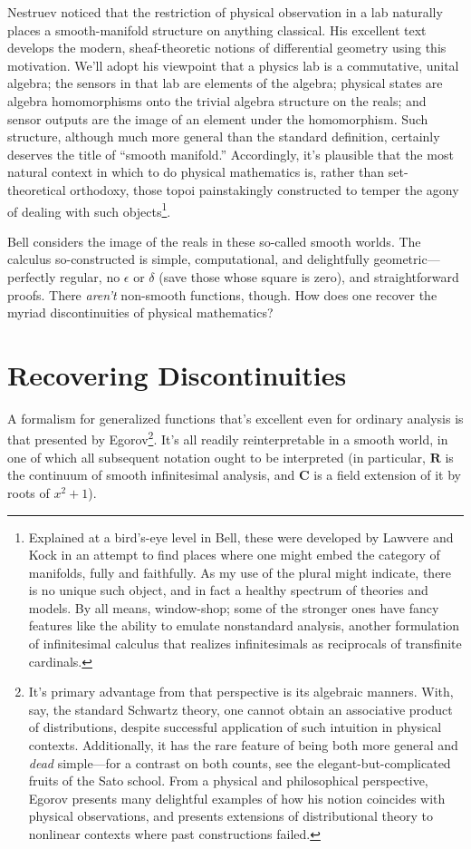 \documentclass{article}
\begin{document}
Nestruev noticed that the restriction of physical observation in a lab naturally places a smooth-manifold structure on anything classical.
His excellent text develops the modern, sheaf-theoretic notions of differential geometry using this motivation.
We'll adopt his viewpoint that a physics lab is a commutative, unital algebra; the sensors in that lab are elements of the algebra;
physical states are algebra homomorphisms onto the trivial algebra structure on the reals;
and sensor outputs are the image of an element under the homomorphism.
Such structure, although much more general than the standard definition, certainly deserves the title of ``smooth manifold.''
Accordingly, it's plausible that the most natural context in which to do physical mathematics is,
rather than set-theoretical orthodoxy, those topoi painstakingly constructed to temper the agony of dealing with such objects\footnote
{
  Explained at a bird's-eye level in Bell, these were developed by Lawvere and Kock in an attempt to find places where
  one might embed the category of manifolds, fully and faithfully.
  As my use of the plural might indicate, there is no unique such object, and in fact a healthy spectrum of theories and models.
  By all means, window-shop; some of the stronger ones have fancy features like the ability to emulate nonstandard analysis,
  another formulation of infinitesimal calculus that realizes infinitesimals as reciprocals of transfinite cardinals.
}.

Bell considers the image of the reals in these so-called smooth worlds.
The calculus so-constructed is simple, computational, and delightfully geometric---perfectly regular, no $\epsilon$ or $\delta$
(save those whose square is zero), and straightforward proofs.
There \textit{aren't} non-smooth functions, though.
How does one recover the myriad discontinuities of physical mathematics?

\section{Recovering Discontinuities}

A formalism for generalized functions that's excellent even for ordinary analysis is that presented by Egorov\footnote
{
  It's primary advantage from that perspective is its algebraic manners.
  With, say, the standard Schwartz theory, one cannot obtain an associative product of distributions,
  despite successful application of such intuition in physical contexts.
  Additionally, it has the rare feature of being both more general and \textit{dead} simple---for a contrast on both counts,
  see the elegant-but-complicated fruits of the Sato school.
  From a physical and philosophical perspective, Egorov presents many delightful examples
  of how his notion coincides with physical observations, and presents extensions of distributional theory
  to nonlinear contexts where past constructions failed.
}.
It's all readily reinterpretable in a smooth world, in one of which all subsequent notation ought to be interpreted (in particular,
$\mathbf{R}$ is the continuum of smooth infinitesimal analysis, and $\mathbf{C}$ is a field extension of it by roots of $x^{2} + 1$).
\end{document}
